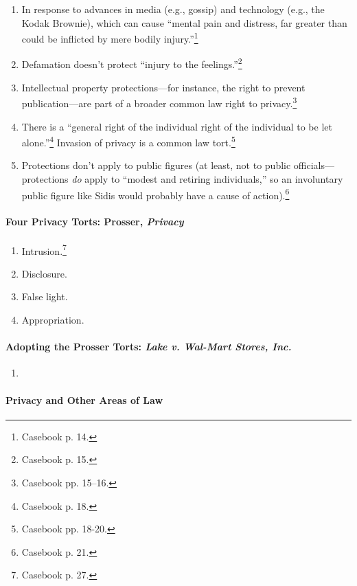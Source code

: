 \begin{enumerate}
    \item In response to advances in media (e.g., gossip) and technology 
    (e.g., the Kodak Brownie), which can cause ``mental pain and distress, far 
    greater than could be inflicted by mere bodily injury.''\footnote{Casebook 
    p. 14.}
    \item Defamation doesn't protect ``injury to the 
    feelings.''\footnote{Casebook p. 15.}
    \item Intellectual property protections---for instance, the right to 
    prevent publication---are part of a broader common law right to 
    privacy.\footnote{Casebook pp. 15--16.}
    \item There is a ``general right of the individual right of the individual 
    to be let alone.''\footnote{Casebook p. 18.} Invasion of privacy is a 
    common law tort.\footnote{Casebook pp. 18-20.}
    \item Protections don't apply to public figures (at least, not to public 
    officials---protections \emph{do} apply to ``modest and retiring 
    individuals,'' so an involuntary public figure like Sidis would probably 
    have a cause of action).\footnote{Casebook p. 21.}
\end{enumerate}

\paragraph{Four Privacy Torts: Prosser, \emph{Privacy}}

\begin{enumerate}
    \item Intrusion.\footnote{Casebook p. 27.}
    \item Disclosure.
    \item False light.
    \item Appropriation.
\end{enumerate}

\paragraph{Adopting the Prosser Torts: \emph{Lake v. Wal-Mart Stores, Inc.}}

\begin{enumerate}
    \item %
\end{enumerate}

\paragraph{Privacy and Other Areas of Law}


